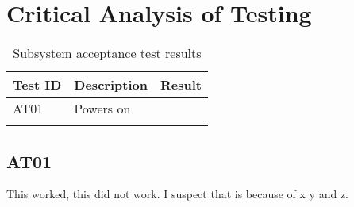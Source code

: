 \documentclass[class=report,11pt,crop=false]{standalone}
\begin{document}
\section{Critical Analysis of Testing}


\begin{table}[h]
  \begin{center}
    \caption{Subsystem acceptance test results}
    \label{tab:testresults}
    \begin{tabular}{ >{\centering\arraybackslash}m{1cm}  m{4cm} m{1cm}}
      \hline
      \textbf{Test ID} & \textbf{Description} & \textbf{Result}\\   
      \hline
      AT01 & Powers on & \\
       &  & \\
      \hline 
    \end{tabular}
  \end{center}
\end{table}

\subsection{AT01}
This worked, this did not work. I suspect that is because of x y and z.

\ifstandalone

\fi
\end{document}
